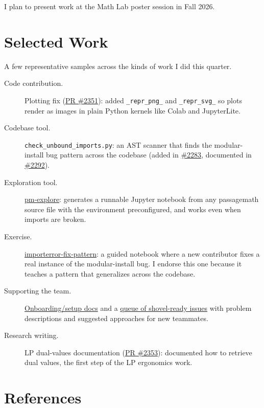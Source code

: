 \documentclass[10pt]{article}
\begin{document}
I plan to present work at the Math Lab poster session in Fall 2026.

\section{Selected Work}

A few representative samples across the kinds of work I did this quarter.

\begin{description}
  \item[Code contribution.] Plotting fix (\href{https://github.com/passagemath/passagemath/pull/2351}{PR \#2351}): added \texttt{\_repr\_png\_} and \texttt{\_repr\_svg\_} so plots render as images in plain Python kernels like Colab and JupyterLite.
  \item[Codebase tool.] \texttt{check\_unbound\_imports.py}: an AST scanner that finds the modular-install bug pattern across the codebase (added in \href{https://github.com/passagemath/passagemath/pull/2283}{\#2283}, documented in \href{https://github.com/passagemath/passagemath/pull/2292}{\#2292}).
  \item[Exploration tool.] \href{https://github.com/sacchen/passagemath-workspace/tree/main/tools/pm-explore}{pm-explore}: generates a runnable Jupyter notebook from any passagemath source file with the environment preconfigured, and works even when imports are broken.
  \item[Exercise.] \href{https://github.com/sacchen/passagemath-workspace/blob/main/exercises/importerror-fix-pattern/importerror-fix-pattern.ipynb}{importerror-fix-pattern}: a guided notebook where a new contributor fixes a real instance of the modular-install bug. I endorse this one because it teaches a pattern that generalizes across the codebase.
  \item[Supporting the team.] \href{https://github.com/sacchen/passagemath-workspace/blob/main/onboarding.md}{Onboarding/setup docs} and a \href{https://github.com/passagemath/passagemath/issues/2269\#issuecomment-4070368357}{queue of shovel-ready issues} with problem descriptions and suggested approaches for new teammates.
  \item[Research writing.] LP dual-values documentation (\href{https://github.com/passagemath/passagemath/pull/2353}{PR \#2353}): documented how to retrieve dual values, the first step of the LP ergonomics work.
\end{description}

\section{References}
\end{document}
